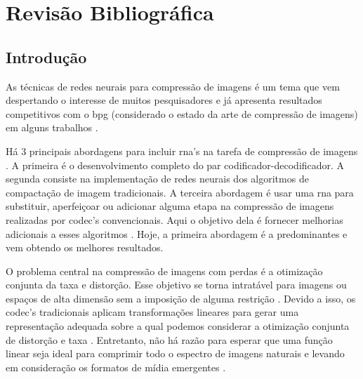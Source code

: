 \chapter{Revisão Bibliográfica}

\section{Introdução}

As técnicas de redes neurais para compressão de imagens é um tema que vem despertando o interesse de muitos pesquisadores e já apresenta resultados competitivos com o \acrshort{bpg} (considerado o estado da arte de compressão de imagens) em alguns trabalhos \cite{Autoregressive2018Minnen,akbari2019dsslic}. 

Há 3 principais abordagens para incluir \acrshort{rna}'s na tarefa de compressão de imagens \cite{Jiang1999}. A primeira é o desenvolvimento completo do par codificador-decodificador. A segunda consiste na implementação de redes neurais dos algoritmos de compactação de imagem tradicionais. A terceira abordagem é usar uma \acrshort{rna} para substituir, aperfeiçoar ou adicionar alguma etapa na compressão de imagens realizadas por \acrshort{codec}'s convencionais. Aqui o objetivo dela é fornecer melhorias adicionais a esses algoritmos \cite{Jiang1999}. Hoje, a primeira abordagem é a predominantes e vem obtendo os melhores resultados.

O problema central na compressão de imagens com perdas é a otimização conjunta da taxa e distorção. Esse objetivo se torna intratável para imagens ou espaços de alta dimensão sem a imposição de alguma restrição \cite{gersho2012vector}. Devido a isso, os \acrshort{codec}'s tradicionais aplicam transformações lineares para gerar uma representação adequada sobre a qual podemos considerar a otimização conjunta de distorção e taxa \cite{End2016Balle}. Entretanto, não há razão para esperar que uma função linear seja ideal para comprimir todo o espectro de imagens naturais e levando em consideração os formatos de mídia emergentes \cite{santurkar2018generative}.  

